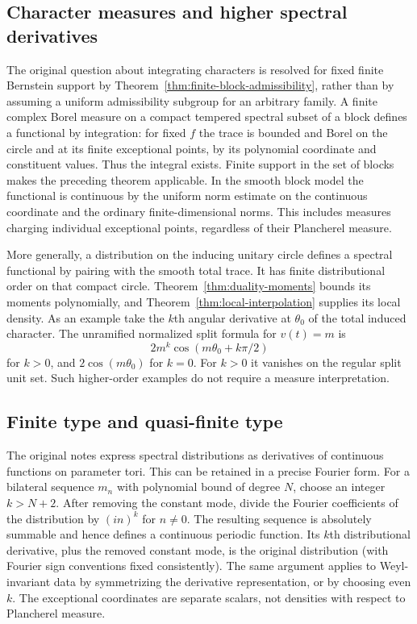 \subsection{Character measures and higher spectral derivatives}
The original question about integrating characters is resolved for fixed finite Bernstein support by Theorem~\ref{thm:finite-block-admissibility}, rather than by assuming a uniform admissibility subgroup for an arbitrary family. A finite complex Borel measure on a compact tempered spectral subset of a block defines a functional by integration: for fixed $f$ the trace is bounded and Borel on the circle and at its finite exceptional points, by its polynomial coordinate and constituent values. Thus the integral exists. Finite support in the set of blocks makes the preceding theorem applicable. In the smooth block model the functional is continuous by the uniform norm estimate on the continuous coordinate and the ordinary finite-dimensional norms. This includes measures charging individual exceptional points, regardless of their Plancherel measure.

More generally, a distribution on the inducing unitary circle defines a spectral functional by pairing with the smooth total trace. It has finite distributional order on that compact circle. Theorem~\ref{thm:duality-moments} bounds its moments polynomially, and Theorem~\ref{thm:local-interpolation} supplies its local density. As an example take the $k$th angular derivative at $\theta_0$ of the total induced character. The unramified normalized split formula for $v(t)=m$ is
\[
2m^k\cos(m\theta_0+k\pi/2)
\]
for $k>0$, and $2\cos(m\theta_0)$ for $k=0$. For $k>0$ it vanishes on the regular split unit set. Such higher-order examples do not require a measure interpretation.

\subsection{Finite type and quasi-finite type}
The original notes express spectral distributions as derivatives of continuous functions on parameter tori. This can be retained in a precise Fourier form. For a bilateral sequence $m_n$ with polynomial bound of degree $N$, choose an integer $k>N+2$. After removing the constant mode, divide the Fourier coefficients of the distribution by $(in)^k$ for $n\ne0$. The resulting sequence is absolutely summable and hence defines a continuous periodic function. Its $k$th distributional derivative, plus the removed constant mode, is the original distribution (with Fourier sign conventions fixed consistently). The same argument applies to Weyl-invariant data by symmetrizing the derivative representation, or by choosing even $k$. The exceptional coordinates are separate scalars, not densities with respect to Plancherel measure.

